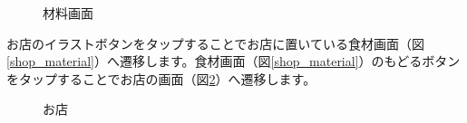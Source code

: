 \documentclass[a4j]{jarticle}
\begin{document}
\begin{figure}[H]
    \begin{center}
    \caption {材料画面}
    \label{material}
    \end{center}
\end{figure}

お店のイラストボタンをタップすることでお店に置いている食材画面（図\ref{shop_material}）へ遷移します。食材画面（図\ref{shop_material}）のもどるボタンをタップすることでお店の画面（図\ref{shop}）へ遷移します。

\begin{figure}[H]
    \begin{center}
    \caption {お店}
    \label{shop}
    \end{center}
\end{figure}
\end{document}
